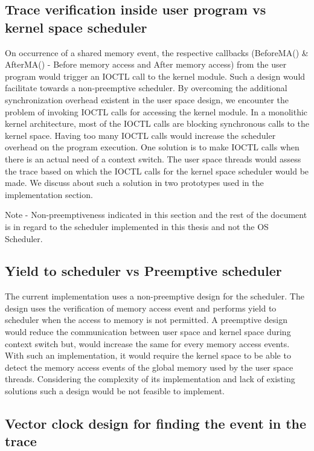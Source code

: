 \subsection{Trace verification inside user program vs kernel space scheduler}

On occurrence of a shared memory event, the respective callbacks (BeforeMA() \& AfterMA() - Before memory access and After memory access) from the user program would trigger an IOCTL call to the kernel module. 
Such a design would facilitate towards a non-preemptive scheduler. 
By overcoming the additional synchronization overhead existent in the user space design, we encounter the problem of invoking IOCTL calls  for accessing the kernel module. 
In a monolithic kernel architecture, most of the IOCTL calls are blocking synchronous calls to the kernel space. 
Having too many IOCTL calls would increase the scheduler overhead on the program execution. 
One solution is to make IOCTL calls when there is an actual need of a  context switch. 
The user space threads would assess the trace based on which the IOCTL calls for the kernel space scheduler would be made. 
We discuss about such a solution in two prototypes used in the implementation section.

Note - Non-preemptiveness indicated in this section and the rest of the document is in regard to the scheduler implemented in this thesis and not the OS Scheduler.

\subsection{Yield to scheduler vs Preemptive scheduler}

The current implementation uses a non-preemptive design for the scheduler. 
The design uses the verification of memory access event and performs yield to scheduler when the access to memory is not permitted. 
A preemptive design would reduce the communication between user space and kernel space during context switch but, would increase the same for every memory access events. 
With such an implementation, it would require the kernel space to be able to detect the memory access events of the global memory used by the user space threads. 
Considering the complexity of its implementation and lack of existing solutions such a design would be not feasible to implement. 


\subsection{Vector clock design for finding the event in the trace}

